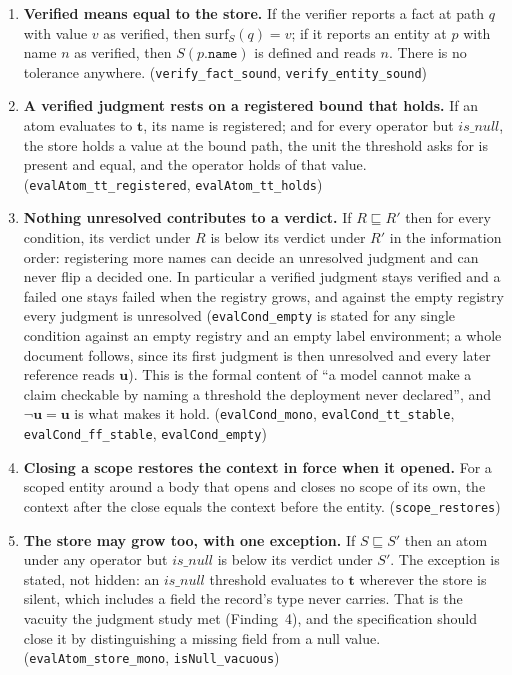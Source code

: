 \documentclass[11pt,a4paper]{article}
\begin{document}
\begin{enumerate}[nosep]
    \item \textbf{Verified means equal to the store.} If the verifier reports a fact at path $q$ with value $v$ as verified, then $\mathrm{surf}_S(q)=v$; if it reports an entity at $p$ with name $n$ as verified, then $S(p\texttt{.name})$ is defined and reads $n$. There is no tolerance anywhere. (\texttt{verify\_fact\_sound}, \texttt{verify\_entity\_sound})
    \item \textbf{A verified judgment rests on a registered bound that holds.} If an atom evaluates to $\mathbf{t}$, its name is registered; and for every operator but $\mathit{is\_null}$, the store holds a value at the bound path, the unit the threshold asks for is present and equal, and the operator holds of that value. (\texttt{evalAtom\_tt\_registered}, \texttt{evalAtom\_tt\_holds})
    \item \textbf{Nothing unresolved contributes to a verdict.} If $R \sqsubseteq R'$ then for every condition, its verdict under $R$ is below its verdict under $R'$ in the information order: registering more names can decide an unresolved judgment and can never flip a decided one. In particular a verified judgment stays verified and a failed one stays failed when the registry grows, and against the empty registry every judgment is unresolved (\texttt{evalCond\_empty} is stated for any single condition against an empty registry and an empty label environment; a whole document follows, since its first judgment is then unresolved and every later reference reads $\mathbf{u}$). This is the formal content of ``a model cannot make a claim checkable by naming a threshold the deployment never declared'', and $\neg\mathbf{u}=\mathbf{u}$ is what makes it hold. (\texttt{evalCond\_mono}, \texttt{evalCond\_tt\_stable}, \texttt{evalCond\_ff\_stable}, \texttt{evalCond\_empty})
    \item \textbf{Closing a scope restores the context in force when it opened.} For a scoped entity around a body that opens and closes no scope of its own, the context after the close equals the context before the entity. (\texttt{scope\_restores})
    \item \textbf{The store may grow too, with one exception.} If $S \sqsubseteq S'$ then an atom under any operator but $\mathit{is\_null}$ is below its verdict under $S'$. The exception is stated, not hidden: an $\mathit{is\_null}$ threshold evaluates to $\mathbf{t}$ wherever the store is silent, which includes a field the record's type never carries. That is the vacuity the judgment study met (Finding~4), and the specification should close it by distinguishing a missing field from a null value. (\texttt{evalAtom\_store\_mono}, \texttt{isNull\_vacuous})
\end{enumerate}
\end{document}
